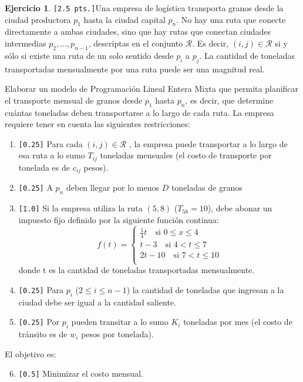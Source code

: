 \documentclass[a4paper,oneside,12pt]{amsart}
\theoremstyle{definition}
\newtheorem{quest}{Ejercicio}
\begin{document}
\begin{quest} 

\verb|[2.5 pts.]|Una empresa de logística transporta granos desde la ciudad productora $p_1$ hasta la ciudad capital $p_n$. No hay una ruta que conecte directamente a ambas ciudades, sino que hay rutas que conectan ciudades intermedias $p_2, \dots, p_{n-1}$, descriptas en el conjunto $\mathcal{R}$. Es decir, $(i,j)\in\mathcal{R}$ si y sólo si existe una ruta de un solo sentido desde $p_i$ a $p_j$. La cantidad de toneladas transportadas mensualmente por una ruta puede ser una magnitud real.

Elaborar un modelo de Programación Lineal Entera Mixta que permita planificar el transporte mensual de granos desde $p_1$ hasta $p_n$, es decir, que determine cuántas toneladas deben transportarse  a lo largo de cada ruta. La empresa requiere tener en cuenta las siguientes restricciones:
\begin{enumerate}
    \item \verb|[0.25]| Para cada $(i,j)\in\mathcal{R}$ , la empresa puede transportar a lo largo de esa ruta a lo sumo $T_{ij}$ toneladas mensuales (el costo de transporte por tonelada es de $c_{ij}$ pesos).
    \item \verb|[0.25]| A $p_n$ deben llegar por lo menos $D$ toneladas de granos
    \item \verb|[1.0]| Si la empresa utiliza la ruta $(5,8)$ ($T_{58}=10$), debe abonar un impuesto fijo definido por la siguiente función continua:
    \[
    f(t) = \begin{cases}
        \frac{1}{4} t \quad \text{si $0\leq x\leq 4$} \\
        t - 3 \quad \text{si $4 < t\leq 7$} \\
        2t - 10 \quad \text{si $7 < t\leq 10$} \\
    \end{cases}
    \]
    donde t es la cantidad de toneladas transportadas mensualmente.
    \item \verb|[0.25]| Para $p_i$ ($2\leq i \leq n-1$) la cantidad de toneladas que ingresan a la ciudad debe ser igual a la cantidad saliente.
    \item \verb|[0.25]| Por $p_i$ pueden transitar a lo sumo $K_i$ toneladas por mes (el costo de tránsito es de $w_i$ pesos por tonelada).
\end{enumerate}

El objetivo es:
\begin{enumerate}
    \setcounter{enumi}{5}
    \item \verb|[0.5]| Minimizar el costo mensual.
\end{enumerate}
\end{quest}
\end{document}

